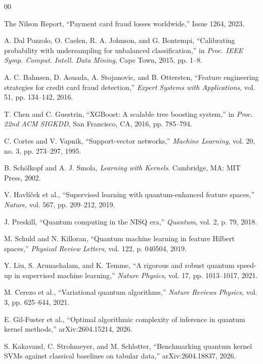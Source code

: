 \documentclass[journal]{IEEEtran}
\begin{document}

\begin{thebibliography}{00}

The Nilson Report, ``Payment card fraud losses worldwide,'' 
Issue 1264, 2023.

A. Dal Pozzolo, O. Caelen, R. A. Johnson, and G. Bontempi, 
``Calibrating probability with undersampling for unbalanced 
classification,'' in \textit{Proc. IEEE Symp. Comput. Intell. 
Data Mining}, Cape Town, 2015, pp. 1--8.

A. C. Bahnsen, D. Aouada, A. Stojanovic, and B. Ottersten, 
``Feature engineering strategies for credit card fraud 
detection,'' \textit{Expert Systems with Applications}, 
vol. 51, pp. 134--142, 2016.

T. Chen and C. Guestrin, ``XGBoost: A scalable tree 
boosting system,'' in \textit{Proc. 22nd ACM SIGKDD}, 
San Francisco, CA, 2016, pp. 785--794.

C. Cortes and V. Vapnik, ``Support-vector networks,'' 
\textit{Machine Learning}, vol. 20, no. 3, 
pp. 273--297, 1995.

B. Sch\"{o}lkopf and A. J. Smola, 
\textit{Learning with Kernels}. 
Cambridge, MA: MIT Press, 2002.

V. Havl\'{i}\v{c}ek et al., 
``Supervised learning with quantum-enhanced feature spaces,'' 
\textit{Nature}, vol. 567, pp. 209--212, 2019.

J. Preskill, ``Quantum computing in the NISQ era,'' 
\textit{Quantum}, vol. 2, p. 79, 2018.

M. Schuld and N. Killoran, ``Quantum machine learning 
in feature Hilbert spaces,'' 
\textit{Physical Review Letters}, vol. 122, p. 040504, 2019.

Y. Liu, S. Arunachalam, and K. Temme, 
``A rigorous and robust quantum speed-up in supervised 
machine learning,'' \textit{Nature Physics}, vol. 17, 
pp. 1013--1017, 2021.

M. Cerezo et al., ``Variational quantum algorithms,'' 
\textit{Nature Reviews Physics}, vol. 3, pp. 625--644, 2021.

E. Gil-Fuster et al., ``Optimal algorithmic complexity of 
inference in quantum kernel methods,'' 
arXiv:2604.15214, 2026.

S. Kakavand, C. Strohmeyer, and M. Schlotter, 
``Benchmarking quantum kernel SVMs against classical 
baselines on tabular data,'' arXiv:2604.18837, 2026.


\end{thebibliography}
\end{document}
